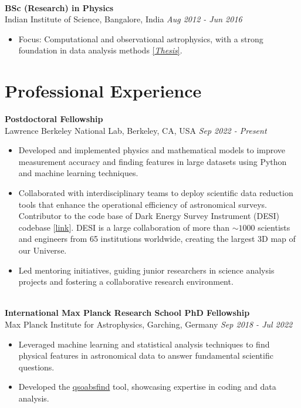 \documentclass[a4paper,10pt]{article}
\begin{document}
\noindent\\
\textbf{BSc (Research) in Physics} \\
Indian Institute of Science, Bangalore, India \hfill \textit{Aug 2012 - Jun 2016} \\
\begin{itemize}[noitemsep, topsep=0pt]
    \item Focus: Computational and observational astrophysics, with a strong foundation in data analysis
methods \href{https://raw.githubusercontent.com/abhi0395/mycv/main/files/BS_thesis.pdf}{[\textit{Thesis}]}.
\end{itemize}

\section*{Professional Experience}
\noindent
\textbf{Postdoctoral Fellowship} \\
Lawrence Berkeley National Lab, Berkeley, CA, USA \hfill \textit{Sep 2022 - Present} \\
\begin{itemize}[noitemsep, topsep=0pt]
    \item Developed and implemented physics and mathematical models to improve measurement accuracy and finding features in large datasets using Python and machine learning techniques. 
     \item Collaborated with interdisciplinary teams to deploy scientific data reduction tools that enhance the operational efficiency of astronomical surveys. Contributor to the code base of Dark Energy Survey Instrument (DESI) codebase [\href{https://github.com/desihub}{link}]. DESI is a large collaboration of more than $\sim1000$ scientists and engineers from 65 institutions worldwide, creating the largest 3D map of our Universe.
        \item Led mentoring initiatives, guiding junior researchers in science analysis projects and fostering a collaborative research environment.
\end{itemize}

\noindent \\
\textbf{International Max Planck Research School PhD Fellowship} \\
Max Planck Institute for Astrophysics, Garching, Germany \hfill \textit{Sep 2018 - Jul 2022} \\
\begin{itemize}[noitemsep, topsep=0pt]
    \item Leveraged machine learning and statistical analysis techniques to find physical features in astronomical data to answer fundamental scientific questions.
    \item Developed the \href{https://github.com/abhi0395/qsoabsfind}{qsoabsfind} tool, showcasing expertise in coding and data analysis.
\end{itemize}
\end{document}
